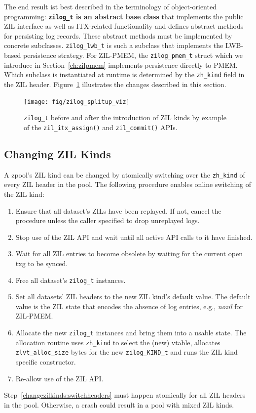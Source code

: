 \documentclass[12pt,a4paper,twoside]{book}
\begin{document}
The end result ist best described in the terminology of object-oriented programming:
\textbf{\lstinline{zilog_t} is an abstract base class} that implements the public ZIL interface as well as ITX-related functionality and defines abstract methods for persisting log records.
These abstract methods must be implemented by concrete subclasses.
\lstinline{zilog_lwb_t} is such a subclass that implements the LWB-based persistence strategy.
For ZIL-PMEM, the \lstinline{zilog_pmem_t} struct which we introduce in Section~\ref{ch:zilpmem} implements persistence directly to PMEM.
Which subclass is instantiated at runtime is determined by the \lstinline{zh_kind} field in the ZIL header.
Figure~\ref{fig:zilog_splitup_viz} illustrates the changes described in this section.

\begin{figure}[H]
    \centering
    \texttt{[image: fig/zilog\_splitup\_viz]}
    \caption{\lstinline{zilog_t} before and after the introduction of ZIL kinds by example of the \lstinline{zil_itx_assign()} and \lstinline{zil_commit()} APIs.}
    \label{fig:zilog_splitup_viz}
\end{figure}


\subsection{Changing ZIL Kinds}\label{sec:zil_kinds:change}
A zpool's ZIL kind can be changed by atomically switching over the \lstinline{zh_kind} of every ZIL header in the pool.
The following procedure enables online switching of the ZIL kind:
\begin{enumerate}[noitemsep]
    \item Ensure that all dataset's ZILs have been replayed. If not, cancel the procedure unless the caller specified to drop unreplayed logs.
    \item Stop use of the ZIL API and wait until all active API calls to it have finished.
    \item Wait for all ZIL entries to become obsolete by waiting for the current open txg to be synced.
    \item Free all dataset's \lstinline{zilog_t} instances.
    \item \label{changezilkinds:switchheaders} Set all datasets' ZIL headers to the new ZIL kind's default value.
        The default value is the ZIL state that encodes the absence of log entries, e.g., \textit{nozil} for ZIL-PMEM.
    \item Allocate the new \lstinline{zilog_t} instances and bring them into a usable state.
        The allocation routine uses \lstinline{zh_kind} to select the (new) vtable, allocates \lstinline{zlvt_alloc_size} bytes for the new \lstinline{zilog_KIND_t} and runs the ZIL kind specific constructor.
    \item Re-allow use of the ZIL API.
\end{enumerate}
Step~\ref{changezilkinds:switchheaders} must happen atomically for all ZIL headers in the pool.
Otherwise, a crash could result in a pool with mixed ZIL kinds.
\end{document}
